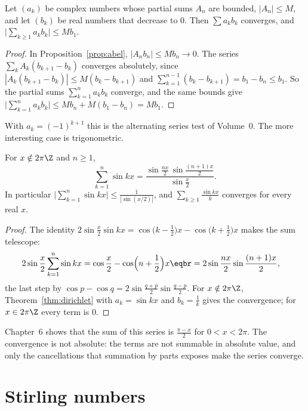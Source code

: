 \begin{theorem}\label{thm:dirichlet}
Let $(a_k)$ be complex numbers whose partial sums $A_n$ are bounded, $|A_n|\le M$, and let $(b_k)$ be real numbers
that decrease to $0$. Then $\sum a_kb_k$ converges, and $\bigl|\sum_{k\ge1}a_kb_k\bigr|\le Mb_1$.
\end{theorem}
\begin{proof}
In Proposition~\ref{prop:abel}, $|A_nb_n|\le Mb_n\to0$. The series $\sum_kA_k(b_{k+1}-b_k)$ converges absolutely,
since $|A_k(b_{k+1}-b_k)|\le M(b_k-b_{k+1})$ and $\sum_{k=1}^{n-1}(b_k-b_{k+1})=b_1-b_n\le b_1$. So the partial sums
$\sum_{k=1}^na_kb_k$ converge, and the same bounds give $\bigl|\sum_{k=1}^na_kb_k\bigr|\le Mb_n+M(b_1-b_n)=Mb_1$.
\end{proof}

With $a_k=(-1)^{k+1}$ this is the alternating series test of Volume~0. The more interesting case is trigonometric.

\begin{proposition}\label{prop:sinsum}
For $x\notin2\pi\Z$ and $n\ge1$,
\[
\sum_{k=1}^n\sin kx=\frac{\sin\frac{nx}2\,\sin\frac{(n+1)x}2}{\sin\frac x2}.
\]
In particular $\bigl|\sum_{k=1}^n\sin kx\bigr|\le\frac1{|\sin(x/2)|}$, and $\sum_{k\ge1}\frac{\sin kx}k$ converges for every real $x$.
\end{proposition}
\begin{proof}
The identity $2\sin\frac x2\sin kx=\cos\bigl(k-\frac12\bigr)x-\cos\bigl(k+\frac12\bigr)x$ makes the sum telescope:
\[
\begin{aligned}2\sin\frac x2\sum_{k=1}^n\sin kx&=\cos\frac x2-\cos\Bigl(n+\frac12\Bigr)x\eqbr=2\sin\frac{nx}2\sin\frac{(n+1)x}2,\end{aligned}
\]
the last step by $\cos p-\cos q=2\sin\frac{q+p}2\sin\frac{q-p}2$. For $x\notin2\pi\Z$, Theorem~\ref{thm:dirichlet} with
$a_k=\sin kx$ and $b_k=\frac1k$ gives the convergence; for $x\in2\pi\Z$ every term is $0$.
\end{proof}

Chapter~6 shows that the sum of this series is $\frac{\pi-x}2$ for $0<x<2\pi$. The convergence is not absolute: the
terms are not summable in absolute value, and only the cancellations that summation by parts exposes make the series
converge.

\section{Stirling numbers}

